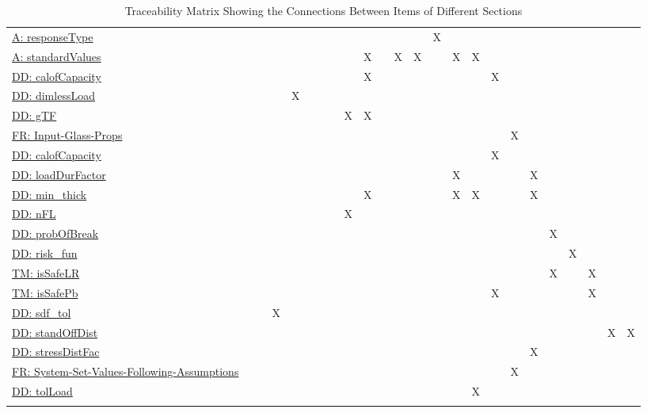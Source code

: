 \documentclass[12pt]{article}
\begin{document}
\begin{longtable}{l l l l l l l l l l l l l l l l l l l l l l l l}
\\
\hyperref[A:responseType]{A: responseType} &  &  &  &  &  &  &  &  &  &  &  &  & X &  &  &  &  &  &  &  &  &  & 
\\
\hyperref[A:standardValues]{A: standardValues} &  &  &  &  &  &  &  &  & X &  & X & X &  & X & X &  &  &  &  &  &  &  & 
\\
\hyperref[DD:calofCapacity]{DD: calofCapacity} &  &  &  &  &  &  &  &  & X &  &  &  &  &  &  & X &  &  &  &  &  &  & 
\\
\hyperref[DD:dimlessLoad]{DD: dimlessLoad} &  &  &  & X &  &  &  &  &  &  &  &  &  &  &  &  &  &  &  &  &  &  & 
\\
\hyperref[DD:gTF]{DD: gTF} &  &  &  &  &  &  &  & X & X &  &  &  &  &  &  &  &  &  &  &  &  &  & 
\\
\hyperref[inputGlassProps]{FR: Input-Glass-Props} &  &  &  &  &  &  &  &  &  &  &  &  &  &  &  &  & X &  &  &  &  &  & 
\\
\hyperref[DD:calofCapacity]{DD: calofCapacity} &  &  &  &  &  &  &  &  &  &  &  &  &  &  &  & X &  &  &  &  &  &  & 
\\
\hyperref[DD:loadDurFactor]{DD: loadDurFactor} &  &  &  &  &  &  &  &  &  &  &  &  &  & X &  &  &  & X &  &  &  &  & 
\\
\hyperref[DD:min.thick]{DD: min\_thick} &  &  &  &  &  &  &  &  & X &  &  &  &  & X & X &  &  & X &  &  &  &  & 
\\
\hyperref[DD:nFL]{DD: nFL} &  &  &  &  &  &  &  & X &  &  &  &  &  &  &  &  &  &  &  &  &  &  & 
\\
\hyperref[DD:probOfBreak]{DD: probOfBreak} &  &  &  &  &  &  &  &  &  &  &  &  &  &  &  &  &  &  & X &  &  &  & 
\\
\hyperref[DD:risk.fun]{DD: risk\_fun} &  &  &  &  &  &  &  &  &  &  &  &  &  &  &  &  &  &  &  & X &  &  & 
\\
\hyperref[TM:isSafeLR]{TM: isSafeLR} &  &  &  &  &  &  &  &  &  &  &  &  &  &  &  &  &  &  & X &  & X &  & 
\\
\hyperref[TM:isSafePb]{TM: isSafePb} &  &  &  &  &  &  &  &  &  &  &  &  &  &  &  & X &  &  &  &  & X &  & 
\\
\hyperref[DD:sdf.tol]{DD: sdf\_tol} &  &  & X &  &  &  &  &  &  &  &  &  &  &  &  &  &  &  &  &  &  &  & 
\\
\hyperref[DD:standOffDist]{DD: standOffDist} &  &  &  &  &  &  &  &  &  &  &  &  &  &  &  &  &  &  &  &  &  & X & X
\\
\hyperref[DD:stressDistFac]{DD: stressDistFac} &  &  &  &  &  &  &  &  &  &  &  &  &  &  &  &  &  & X &  &  &  &  & 
\\
\hyperref[sysSetValsFollowingAssumps]{FR: System-Set-Values-Following-Assumptions} &  &  &  &  &  &  &  &  &  &  &  &  &  &  &  &  & X &  &  &  &  &  & 
\\
\hyperref[DD:tolLoad]{DD: tolLoad} &  &  &  &  &  &  &  &  &  &  &  &  &  &  & X &  &  &  &  &  &  &  & 
\\
\bottomrule
\caption{Traceability Matrix Showing the Connections Between Items of Different Sections}
\label{Table:Tracey}
\end{longtable}
\end{document}
